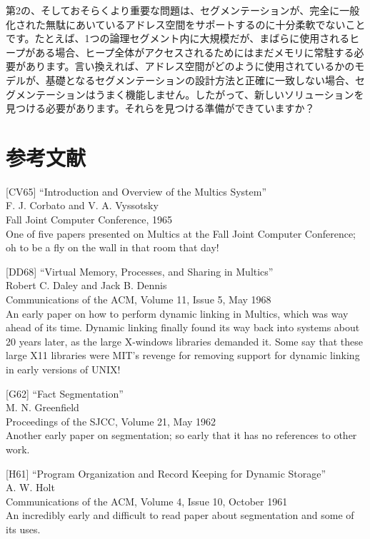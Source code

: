 第2の、そしておそらくより重要な問題は、セグメンテーションが、完全に一般化された無駄にあいているアドレス空間をサポートするのに十分柔軟でないことです。たとえば、1つの論理セグメント内に大規模だが、まばらに使用されるヒープがある場合、ヒープ全体がアクセスされるためにはまだメモリに常駐する必要があります。言い換えれば、アドレス空間がどのように使用されているかのモデルが、基礎となるセグメンテーションの設計方法と正確に一致しない場合、セグメンテーションはうまく機能しません。したがって、新しいソリューションを見つける必要があります。それらを見つける準備ができていますか？

\hypertarget{ux53c2ux8003ux6587ux732e-8}{%
\section*{参考文献}\label{ux53c2ux8003ux6587ux732e-8}}

{[}CV65{]} ``Introduction and Overview of the Multics System''\\
F. J. Corbato and V. A. Vyssotsky\\
Fall Joint Computer Conference, 1965\\
One of five papers presented on Multics at the Fall Joint Computer
Conference; oh to be a fly on the wall in that room that day!

{[}DD68{]} ``Virtual Memory, Processes, and Sharing in Multics''\\
Robert C. Daley and Jack B. Dennis\\
Communications of the ACM, Volume 11, Issue 5, May 1968\\
An early paper on how to perform dynamic linking in Multics, which was
way ahead of its time. Dynamic linking finally found its way back into
systems about 20 years later, as the large X-windows libraries demanded
it. Some say that these large X11 libraries were MIT's revenge for
removing support for dynamic linking in early versions of UNIX!

{[}G62{]} ``Fact Segmentation''\\
M. N. Greenfield\\
Proceedings of the SJCC, Volume 21, May 1962\\
Another early paper on segmentation; so early that it has no references
to other work.

{[}H61{]} ``Program Organization and Record Keeping for Dynamic
Storage''\\
A. W. Holt\\
Communications of the ACM, Volume 4, Issue 10, October 1961\\
An incredibly early and difficult to read paper about segmentation and
some of its uses.


